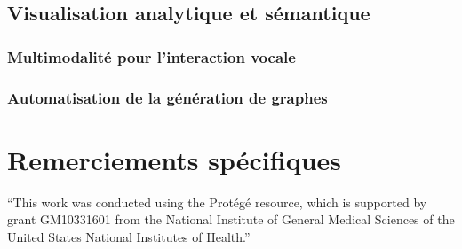 \subsection*{Visualisation analytique et sémantique}

\subsubsection{Multimodalité pour l'interaction vocale}

\subsubsection{Automatisation de la génération de graphes}

\section*{Remerciements spécifiques}

“This work was conducted using the Protégé resource, which is supported by grant GM10331601 from the National Institute of General Medical Sciences of the United States National Institutes of Health.” 